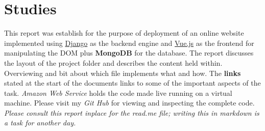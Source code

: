\documentclass[11pt]{article}
\begin{document}
\section{Studies}
This report was establish for the purpose of deployment of an online website implemented using \href{https://www.djangoproject.com/}{Django} as the backend engine and \href{https://vuejs.org/}{Vue.js} as the frontend for manipulating the DOM plus \textbf{MongoDB} for the database.
The report discusses the layout of the project folder and describes the content held within.
Overviewing and bit about which file implements what and how.
The \textbf{links} stated at the start of the documents links to some of the important aspects of the task.
\textit{Amazon Web Service} holds the code made live running on a virtual machine.
Please visit my \textit{Git Hub} for viewing and inspecting the complete code.
\textit{Please consult this report inplace for the read.me file; writing this in markdown is a task for another day.}
\end{document}
